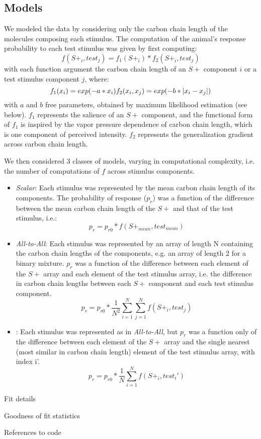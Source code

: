 \subsection*{Models}
\label{sec:methods_models}

We modeled the data by considering only the carbon chain length of the molecules composing each stimulus.  
The computation of the animal's response probability to each test stimulus was given by first computing: 
\begin{equation}
f(S+_i,test_j) = f_1(S+_i) * f_2(S+_i,test_j)
\end{equation}
with each function argument the carbon chain length of an $S+$ component $i$ or a test stimulus component $j$, where:
\begin{equation}
f_1(x_i) = exp(-a*x_i) \\
f_2(x_i,x_j) = exp(-b*|x_i-x_j|)
\end{equation}
with $a$ and $b$ free parameters, obtained by maximum likelihood estimation (see below).  
$f_1$ represents the salience of an $S+$ component, and the functional form of $f_1$ is inspired by the vapor pressure dependence of carbon chain length, which is one component of perceived intensity.  $f_2$ represents the generalization gradient across carbon chain length.  

We then considered 3 classes of models, varying in computational complexity, i.e. the number of computations of $f$ across stimulus components.  
\begin{itemize}
\item \textit{Scalar}: Each stimulus was represented by the mean carbon chain length of its components.  The probability of response ($p_r$) was a function of the difference between the mean carbon chain length of the $S+$ and that of the test stimulus, i.e.:
\begin{equation}
p_r = p_{r0} * f(S+_{mean},test_{mean})
\end{equation}
\item \textit{All-to-All}: Each stimulus was represented by an array of length N containing the carbon chain lengths of the components, e.g. an array of length 2 for a binary mixture. $p_r$ was a function of the difference between each element of the $S+$ array and each element of the test stimulus array, i.e. the difference in carbon chain lengths between each $S+$ component and each test stimulus component.  
\begin{equation}
p_r = p_{r0} * \frac{1}{N^2}\sum_{i=1}^{N}\sum_{j=1}^{N}f(S+_i,test_j)
\end{equation}
\item {}: Each stimulus was represented as in \textit{All-to-All}, but $p_r$ was a function only of the difference between each element of the $S+$ array and the single nearest (most similar in carbon chain length) element of the test stimulus array, with index i'.  
\begin{equation}
p_r = p_{r0} * \frac{1}{N}\sum_{i=1}^{N}f(S+_i,test_i')
\end{equation}
\end{itemize}

\item Fit details
\item Goodness of fit statistics
\item References to code
